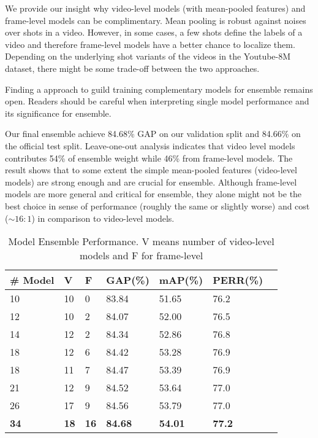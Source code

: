 \documentclass[10pt,twocolumn,letterpaper]{article}
\begin{document}
We provide our insight why video-level models (with mean-pooled features) and frame-level models can be complimentary. Mean pooling is robust against noises over shots in a video. However, in some cases, a few shots define the labels of a video and therefore frame-level models have a better chance to localize them. Depending on the underlying shot variants of the videos in the Youtube-8M dataset, there might be some trade-off between the two approaches.

Finding a approach to guild training complementary models for ensemble remains open. Readers should be careful when interpreting single model performance and its significance for ensemble.

Our final ensemble achieve 84.68\% GAP on our validation split and 84.66\% on the official test split. Leave-one-out analysis indicates that video level models contributes 54\% of ensemble weight while 46\% from frame-level models. The result shows that to some extent the simple mean-pooled features (video-level models) are strong enough and are crucial for ensemble. Although frame-level models are more general and critical for ensemble, they alone might not be the best choice in sense of performance (roughly the same or slightly worse) and cost ($\sim16:1$) in comparison to video-level models.

\begin{table}[]
\centering
\caption{Model Ensemble Performance. V means number of video-level models and F for frame-level}
\label{ensemble_peroformance}
\begin{tabular}{lllllll}
\# Model & V & F &GAP(\%) & mAP(\%) & PERR(\%) \\ \hline \hline
10 & 10 & 0 & 83.84 & 51.65 & 76.2 \\
12 & 10 & 2 & 84.07 & 52.00 & 76.5 \\
14 & 12 & 2 & 84.34 & 52.86 &  76.8 \\
18 & 12 & 6 & 84.42 & 53.28 & 76.9 \\
18 & 11 & 7 & 84.47 & 53.39 & 76.9 \\
21 & 12 & 9 & 84.52 & 53.64 & 77.0 \\
26 & 17 & 9 & 84.56 & 53.79 & 77.0 \\
\textbf{34} & \textbf{18} & \textbf{16} & \textbf{84.68} & \textbf{54.01} & \textbf{77.2} \\
\hline %
\end{tabular}
\end{table}
\end{document}
